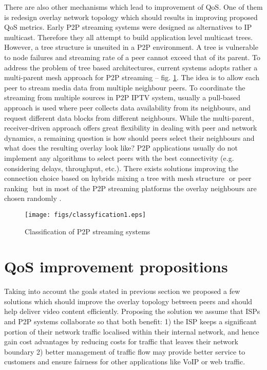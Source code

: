 \documentclass[10pt, conference, compsocconf]{IEEEtran}
\begin{document}
There are also other mechanisms which lead to improvement of QoS. One of them is redesign overlay network topology which should results in improving proposed QoS metrics. Early P2P streaming systems were designed as alternatives to IP multicast. Therefore they all attempt to build application level multicast trees. However, a tree structure is unsuited in a P2P environment. A tree is vulnerable to node failures and streaming rate of a peer cannot exceed that of its parent. To address the problem of tree based architectures, current systems adopts rather a multi-parent mesh approach for P2P streaming -- fig. \ref{fig:classyfication1}. The idea is to allow each peer to stream media data from multiple neighbour peers. To coordinate the streaming from multiple sources in P2P IPTV system, usually a pull-based approach is used where peer collects data availability from its neighbours, and request different data blocks from different neighbours. While the multi-parent, receiver-driven approach offers great flexibility in dealing with peer and network dynamics, a remaining question is how should peers select their neighbours and what does the resulting overlay look like? P2P applications usually do not implement any algorithms to select peers with the best connectivity (e.g. considering delays, throughput, etc.). There exists solutions improving the connection choice based on hybrids mixing a tree with mesh structure \cite{zhang_peer-to-peer_2005}⁠ or peer ranking \cite{xie_p4p:_2008}⁠\cite{aggarwal_isp-aided_2008} but in most of the P2P streaming platforms the overlay neighbours are chosen randomly \cite{zhang_coolstreaming/donet:data-driven_2005} \cite{wu_magellan:_2007}⁠.
\begin{figure}[!t]
\centering
\texttt{[image: figs/classyfication1.eps]}
\caption{Classification of {P2P} streaming systems}
\label{fig:classyfication1}
\end{figure}

\section{QoS improvement propositions}
Taking into account the goals stated in previous section we proposed a few solutions which should improve the overlay topology between peers and should help deliver video content efficiently. Proposing the solution we assume that ISPs and P2P systems collaborate so that both benefit: 1) the ISP keeps a significant portion of their network traffic localised within their internal network, and hence gain cost advantages by reducing costs for traffic that leaves their network boundary 2) better management of traffic flow may provide better service to customers and ensure fairness for other applications like VoIP or web traffic. 
\end{document}
